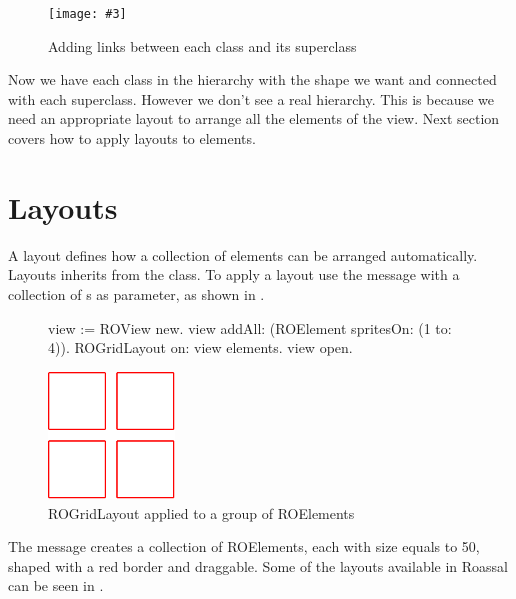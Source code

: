 \documentclass[a4paper,10pt,twoside]{book}
\newcommand{\fig}[4]{
		\begin{figure}[#1]
			\centering
			\texttt{[image: \#3]}
			\caption{\label{fig:#3}#4}
		\end{figure}}
\begin{document}
\fig{H}{0.6}{hier3}{Adding links between each class and its superclass}

Now we have each class in the  hierarchy with the shape we want and connected with each superclass. However we don't see a real hierarchy. This is because we need an appropriate layout to arrange all the elements of the view. Next section covers how to apply layouts to elements.


\section{Layouts} 
A layout defines how a collection of elements can be arranged automatically. Layouts inherits from the  class. To apply a layout use the  message with a collection of s as parameter, as shown in .


\begin{figure}[H]
\label{fig:primerLayout}
      \begin{minipage}[t]{0.5\textwidth}
      \vspace{0pt}
     \begin{code}{}
view := ROView new.
view 
	addAll: (ROElement spritesOn: (1 to: 4)).
ROGridLayout on: view elements.
view open.
  \end{code}
   \end{minipage}
   \hfill
   \begin{minipage}[t]{0.6\textwidth}
      \vspace{0pt} \raggedright
       \centering
		\includegraphics[width=0.3\textwidth]{ROGrid2} %
   \end{minipage}

\caption{ROGridLayout applied to a group of ROElements}
\end{figure} 

The message  creates a collection of ROElements, each with size equals to 50, shaped with a red border and draggable. Some of the layouts available in Roassal can be seen in . 
\end{document}
